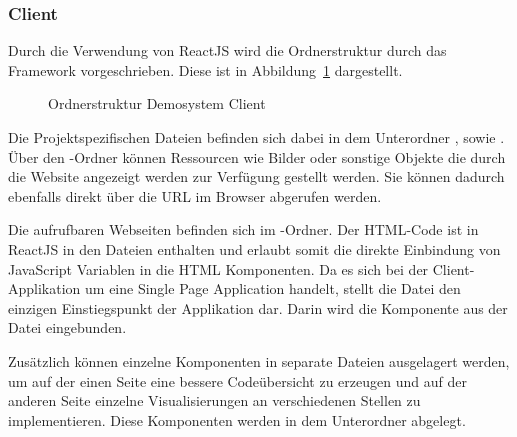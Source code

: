 \subsubsection{Client}
Durch die Verwendung von ReactJS wird die Ordnerstruktur durch das Framework vorgeschrieben.
Diese ist in Abbildung~\ref{fig:OrdnerstrukturClient} dargestellt.
\begin{figure}[H]
    \caption{Ordnerstruktur Demosystem Client}
    \label{fig:OrdnerstrukturClient}
\end{figure}
Die Projektspezifischen Dateien befinden sich dabei in dem Unterordner , sowie .
Über den -Ordner können Ressourcen wie Bilder oder sonstige Objekte die durch die Website angezeigt werden zur Verfügung gestellt werden.
Sie können dadurch ebenfalls direkt über die URL im Browser abgerufen werden.

Die aufrufbaren Webseiten befinden sich im -Ordner.
Der \ac{HTML}-Code ist in ReactJS in den  Dateien enthalten und erlaubt somit die direkte Einbindung von JavaScript Variablen in die \ac{HTML} Komponenten.
Da es sich bei der Client-Applikation um eine Single Page Application handelt, stellt die  Datei den einzigen Einstiegspunkt der Applikation dar.
Darin wird die Komponente  aus der Datei  eingebunden.

Zusätzlich können einzelne Komponenten in separate Dateien ausgelagert werden, um auf der einen Seite eine bessere Codeübersicht zu erzeugen und auf der anderen Seite einzelne Visualisierungen an verschiedenen Stellen zu implementieren.
Diese Komponenten werden in dem Unterordner  abgelegt.

